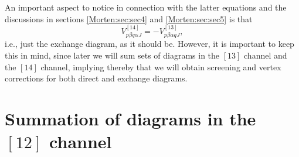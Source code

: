An important aspect to notice in connection with the latter
equations and the discussions in  sections \ref{Morten:sec:sec4}
and \ref{Morten:sec:sec5} is that 
\begin{equation} 
    V_{p\beta q\alpha J}^{[14]}=-V_{p\beta \alpha q J}^{[13]},
\end{equation}
i.e., just the exchange diagram, as it should be.
However, it is important to keep this in mind, since later we
will sum  sets of diagrams in the
$[13]$ channel and the $[14]$ channel, implying thereby that
we will obtain screening and vertex corrections
for  both direct and exchange  diagrams. 

\section{Summation of diagrams in the $[12]$ channel}
\label{Morten:sec:sec3}


